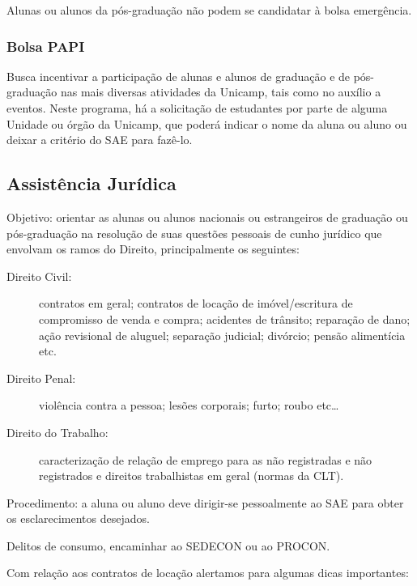 Alunas ou alunos da pós-graduação não podem se candidatar à bolsa emergência.

\subsubsection{Bolsa PAPI}

Busca incentivar a participação de alunas e alunos de graduação e de
pós-graduação nas mais diversas atividades da Unicamp, tais como no auxílio a
eventos. Neste programa, há a solicitação de estudantes por parte de alguma
Unidade ou órgão da Unicamp, que poderá indicar o nome da aluna ou aluno ou
deixar a critério do SAE para fazê-lo.

\subsection{Assistência Jurídica}

Objetivo: orientar as alunas ou alunos nacionais ou estrangeiros de graduação
ou pós-graduação na resolução de suas questões pessoais de cunho jurídico que
envolvam os ramos do Direito, principalmente os seguintes:

\begin{description}
\item[Direito Civil:] contratos em geral; contratos de locação de
  imóvel/escritura de compromisso de venda e compra; acidentes de trânsito;
  reparação de dano; ação revisional de aluguel; separação judicial; divórcio;
  pensão alimentícia etc.

\item[Direito Penal:] violência contra a pessoa; lesões corporais; furto; roubo
  etc{\dots}

\item[Direito do Trabalho:] caracterização de relação de emprego para as não
  registradas e não registrados e direitos trabalhistas em geral (normas da
  CLT).
\end{description}

Procedimento: a aluna ou aluno deve dirigir-se pessoalmente ao SAE para obter
os esclarecimentos desejados.

Delitos de consumo, encaminhar ao SEDECON ou ao PROCON.

Com relação aos contratos de locação alertamos para algumas dicas importantes:

